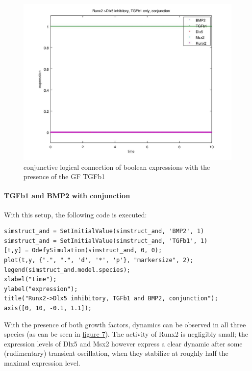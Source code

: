 \documentclass[11pt]{article}
\begin{document}
\begin{figure}[!htb]
	\centering
	\includegraphics[scale=0.55]{case2.jpg}
	\caption{\label{secondCase} conjunctive logical connection of boolean expressions with the presence of the GF TGFb1}
\end{figure}

\paragraph{TGFb1 and BMP2 with conjunction}
With this setup, the following code is executed:
\begin{lstlisting}
simstruct_and = SetInitialValue(simstruct_and, 'BMP2', 1)
simstruct_and = SetInitialValue(simstruct_and, 'TGFb1', 1)
[t,y] = OdefySimulation(simstruct_and, 0, 0);
plot(t,y, {".", ".", 'd', '*', 'p'}, "markersize", 2);
legend(simstruct_and.model.species);
xlabel("time");
ylabel("expression");
title("Runx2->Dlx5 inhibitory, TGFb1 and BMP2, conjunction");
axis([0, 10, -0.1, 1.1]);
\end{lstlisting}
With the presence of both growth factors, dynamics can be observed in all three species (as can be seen in \hyperref[thirdCase]{figure 7}).
The activity of Runx2 is negligibly small; the expression levels of Dlx5 and Msx2 however express a clear dynamic after some (rudimentary) transient oscillation, when they stabilize at roughly half the maximal expression level.
\end{document}
